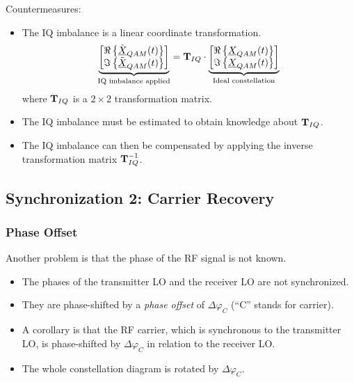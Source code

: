 \begin{refsection}
Countermeasures:
\begin{itemize}
	\item The IQ imbalance is a linear coordinate transformation.
	\begin{equation}
		\underbrace{\left[\begin{matrix}\Re\left\{\tilde{\underline{X}}_{QAM}(t)\right\}\\ \Im\left\{\tilde{\underline{X}}_{QAM}(t)\right\}\end{matrix}\right]}_{\text{IQ imbalance applied}} = \bm{\mathrm{T}}_{IQ} \cdot \underbrace{\left[\begin{matrix}\Re\left\{\underline{X}_{QAM}(t)\right\}\\ \Im\left\{\underline{X}_{QAM}(t)\right\}\end{matrix}\right]}_{\text{Ideal constellation}}
	\end{equation}
	where $\bm{\mathrm{T}}_{IQ}$ is a $2 \times 2$ transformation matrix.
	\item The IQ imbalance must be estimated to obtain knowledge about $\bm{\mathrm{T}}_{IQ}$.
	\item The IQ imbalance can then be compensated by applying the inverse transformation matrix $\bm{\mathrm{T}}_{IQ}^{-1}$.
\end{itemize}

\subsection{Synchronization 2: Carrier Recovery}

\subsubsection{Phase Offset}

Another problem is that the phase of the \ac{RF} signal is not known.
\begin{itemize}
	\item The phases of the transmitter \ac{LO} and the receiver \ac{LO} are not synchronized.
	\item They are phase-shifted by a \emph{phase offset} of $\Delta \varphi_{C}$ (``C'' stands for carrier).
	\item A corollary is that the \ac{RF} carrier, which is synchronous to the transmitter \ac{LO}, is phase-shifted by $\Delta \varphi_{C}$ in relation to the receiver \ac{LO}.
	\item The whole constellation diagram is rotated by $\Delta \varphi_{C}$.
\end{itemize}


\end{refsection}
